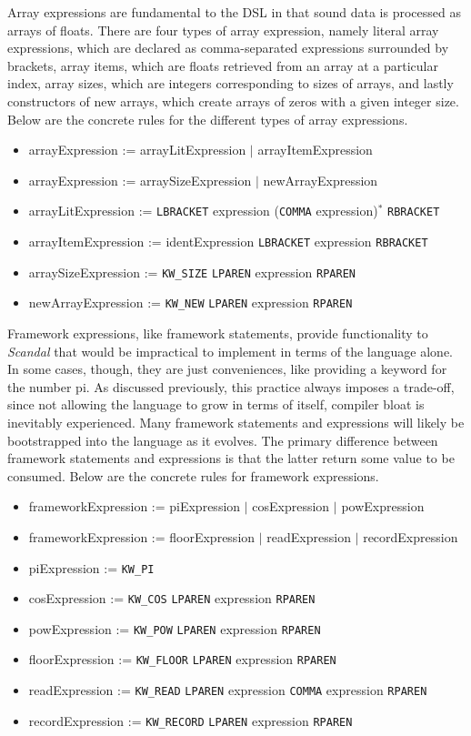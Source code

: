 Array expressions are fundamental to the DSL in that sound data is processed as arrays of floats. There are four types of array expression, namely literal array expressions, which are declared as comma-separated expressions surrounded by brackets, array items, which are floats retrieved from an array at a particular index, array sizes, which are integers corresponding to sizes of arrays, and lastly constructors of new arrays, which create arrays of zeros with a given integer size. Below are the concrete rules for the different types of array expressions.

\begin{itemize}
	\item arrayExpression := arrayLitExpression $|$ arrayItemExpression
	\item arrayExpression := arraySizeExpression $|$ newArrayExpression
	\item arrayLitExpression := \texttt{LBRACKET} expression (\texttt{COMMA} expression)$^*$ \texttt{RBRACKET}
	\item arrayItemExpression := identExpression \texttt{LBRACKET} expression \texttt{RBRACKET}
	\item arraySizeExpression := \texttt{KW\_SIZE} \texttt{LPAREN} expression \texttt{RPAREN}
	\item newArrayExpression := \texttt{KW\_NEW} \texttt{LPAREN} expression \texttt{RPAREN}
\end{itemize}

Framework expressions, like framework statements, provide functionality to \emph{Scandal} that would be impractical to implement in terms of the language alone. In some cases, though, they are just conveniences, like providing a keyword for the number pi. As discussed previously, this practice always imposes a trade-off, since not allowing the language to grow in terms of itself, compiler bloat is inevitably experienced. Many framework statements and expressions will likely be bootstrapped into the language as it evolves. The primary difference between framework statements and expressions is that the latter return some value to be consumed. Below are the concrete rules for framework expressions.

\begin{itemize}
	\item frameworkExpression := piExpression $|$ cosExpression $|$ powExpression
	\item frameworkExpression := floorExpression $|$ readExpression $|$ recordExpression
	\item piExpression := \texttt{KW\_PI}
	\item cosExpression := \texttt{KW\_COS} \texttt{LPAREN} expression \texttt{RPAREN}
	\item powExpression := \texttt{KW\_POW} \texttt{LPAREN} expression \texttt{RPAREN}
	\item floorExpression := \texttt{KW\_FLOOR} \texttt{LPAREN} expression \texttt{RPAREN}
	\item readExpression := \texttt{KW\_READ} \texttt{LPAREN} expression \texttt{COMMA} expression \texttt{RPAREN}
	\item recordExpression := \texttt{KW\_RECORD} \texttt{LPAREN} expression \texttt{RPAREN}
\end{itemize}

